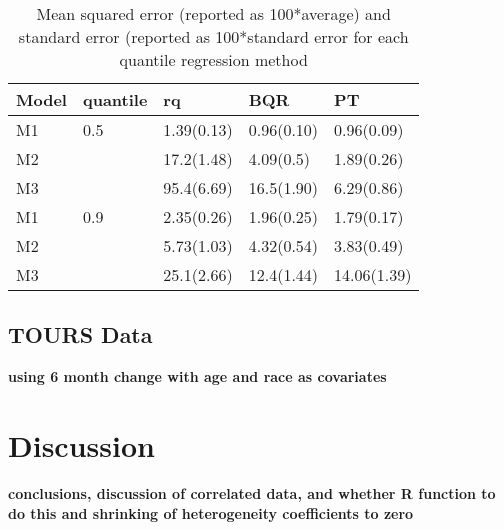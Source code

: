 \documentclass[12pt]{article}
\begin{document}
\begin{center}
\begin{table}[h]
\centering
\caption[]{ Mean squared error (reported as 100*average) and standard
  error (reported as 100*standard error for each
  quantile regression method}
\vspace{4mm}
\begin{tabular}[tb]{l|l|l|l|l}
\hline
Model & quantile & rq         & BQR        & PT          \\
\hline
M1    & 0.5      & 1.39(0.13) & 0.96(0.10) & 0.96(0.09)  \\
M2    &          & 17.2(1.48) & 4.09(0.5)  & 1.89(0.26)  \\
M3    &          & 95.4(6.69) & 16.5(1.90) & 6.29(0.86)  \\
\hline
M1    & 0.9      & 2.35(0.26) & 1.96(0.25) & 1.79(0.17)  \\
M2    &          & 5.73(1.03) & 4.32(0.54) & 3.83(0.49)  \\
M3    &          & 25.1(2.66) & 12.4(1.44) & 14.06(1.39) \\
\hline
\end{tabular}
\label{tab:1}
\end{table}
\end{center}

\subsection{TOURS Data}
% 
% 
{\bf using 6 month change with age and race as covariates}
\section{Discussion}
{\bf conclusions, discussion of correlated data, and whether R
  function to do this and shrinking of heterogeneity coefficients to zero}
\end{document}
